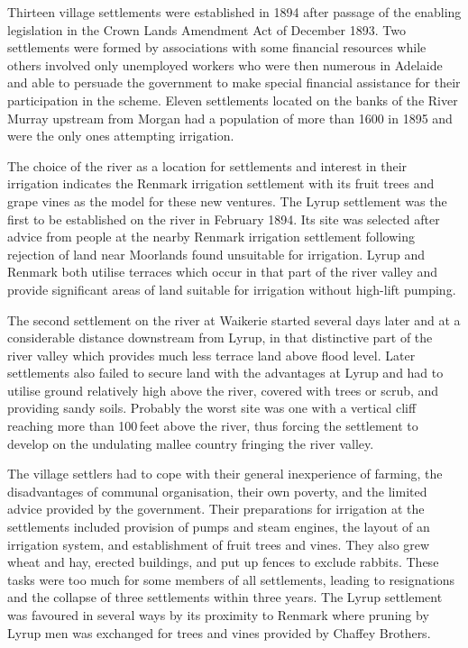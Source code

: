Thirteen village settlements were established in 1894 after passage of
the enabling legislation in the Crown Lands Amendment Act of December
1893.  Two settlements were formed by associations with some financial
resources while others involved only unemployed workers who were then
numerous in Adelaide and able to persuade the government to make
special financial assistance for their participation in the scheme.
Eleven settlements located on the banks of the River Murray
 upstream
from Morgan  had a population of more than 1600 in
1895 and were the only ones attempting irrigation.

The choice of the river as a location for settlements and interest in
their irrigation indicates the Renmark  irrigation
settlement with its fruit trees and grape vines as the model for these
new ventures.  The Lyrup  settlement was the first to
be established on the river in February 1894.  Its site was selected
after advice from people at the nearby Renmark irrigation settlement
following rejection of land near Moorlands found unsuitable for
irrigation.  Lyrup and Renmark both utilise terraces which occur in
that part of the river valley and provide significant areas of land
suitable for irrigation without high-lift pumping.

The second settlement on the river at Waikerie 
started several days later and at a considerable distance downstream
from Lyrup, in that distinctive part of the river valley which
provides much less terrace land above flood level.  Later settlements
also failed to secure land with the advantages at Lyrup and had to
utilise ground relatively high above the river, covered with trees or
scrub, and providing sandy soils.  Probably the worst site was one
with a vertical cliff reaching more than 100\,feet above the river, thus
forcing the settlement to develop on the undulating mallee country
fringing the river valley.

The village settlers had to cope with their general inexperience of
farming, the disadvantages of communal organisation, their own
pov\-er\-ty, and the limited advice provided by the government.  Their
preparations for irrigation at the settlements included provision of
pumps and steam engines, the layout of an irrigation system, and
establishment of fruit trees and vines.  They also grew wheat and hay,
erected buildings, and put up fences to exclude rabbits.  These tasks
were too much for some members of all settlements, leading to
resignations and the collapse of three settlements within three years.
The Lyrup settlement was favoured in several ways by its proximity to
Renmark where pruning by Lyrup men was exchanged for trees and vines
provided by  Chaffey
Brothers.

